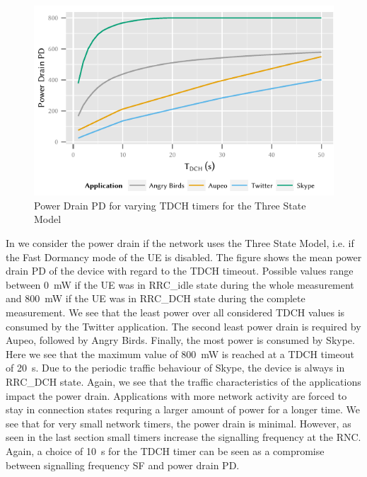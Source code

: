 \begin{figure}
	\centering
	\includegraphics{network/network_traces/numerical_results/figures/3_state_tdch_vs_power_drain}
	\caption{Power Drain \gls{PD} for varying \gls{TDCH} timers for the Three State Model}\label{fig:network:network_traces:numerical_results:three_states:power_drain}
\end{figure}
In  we consider the power drain if the network uses the Three State Model, i.e. if the Fast Dormancy mode of the \gls{UE} is disabled.
The figure shows the mean power drain \gls{PD} of the device with regard to the \gls{TDCH} timeout.
Possible values range between \SI{0}{\milli\watt} if the \gls{UE} was in \gls{RRC_idle} state during the whole measurement and \SI{800}{\milli\watt} if the \gls{UE} was in \gls{RRC_DCH} state during the complete measurement.
We see that the least power over all considered \gls{TDCH} values is consumed by the Twitter application.
The second least power drain is required by Aupeo, followed by Angry Birds.
Finally, the most power is consumed by Skype.
Here we see that the maximum value of \SI{800}{\milli\watt} is reached at a \gls{TDCH} timeout of \SI{20}{\second}.
Due to the periodic traffic behaviour of Skype, the device is always in \gls{RRC_DCH} state.
Again, we see that the traffic characteristics of the applications impact the power drain.
Applications with more network activity are forced to stay in connection states requring a larger amount of power for a longer time.
We see that for very small network timers, the power drain is minimal.
However, as seen in the last section small timers increase the signalling frequency at the \gls{RNC}.
Again, a choice of \SI{10}{\second} for the \gls{TDCH} timer can be seen as a compromise between signalling frequency \gls{SF} and power drain \gls{PD}.

